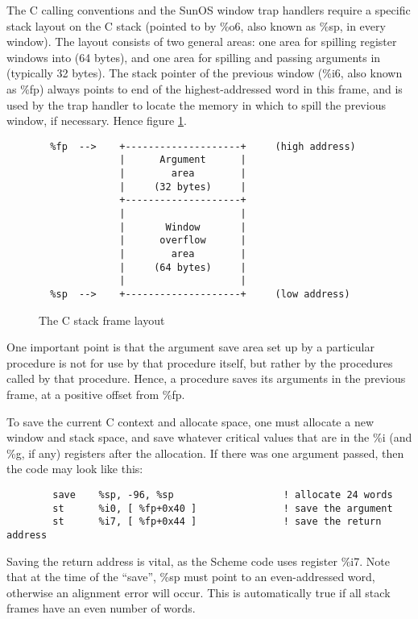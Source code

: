 The C calling conventions and the SunOS window trap handlers require a
specific stack layout on the C stack (pointed to by \%o6, also known as
\%sp, in every window). The layout consists of two general areas: one
area for spilling register windows into (64 bytes), and one area for
spilling and passing arguments in (typically 32 bytes). The stack
pointer of the previous window (\%i6, also known as \%fp) always points
to end of the highest-addressed word in this frame, and is used by
the trap handler to locate the memory in which to spill the previous
window, if necessary. Hence figure \ref{c-args}.

\begin{figure}[hbt]
\begin{verbatim}
  %fp  -->    +--------------------+     (high address)
              |      Argument      |
              |        area        |
              |     (32 bytes)     |
              +--------------------+
              |                    |
              |       Window       |
              |      overflow      |
              |        area        |
              |     (64 bytes)     |
              |                    |
  %sp  -->    +--------------------+     (low address)
\end{verbatim}
\caption{The C stack frame layout}
\label{c-args}
\end{figure}

One important point is that the argument save area set up by a particular
procedure is not for use by that procedure itself, but rather by the
procedures called by that procedure. Hence, a procedure saves its arguments
in the previous frame, at a positive offset from \%fp.

To save the current C context and allocate space, one must allocate a
new window and stack space, and save whatever critical values that are
in the \%i (and \%g, if any) registers after the allocation. If there
was one argument passed, then the code may look like this:

\begin{verbatim}
        save    %sp, -96, %sp                   ! allocate 24 words
        st      %i0, [ %fp+0x40 ]               ! save the argument
        st      %i7, [ %fp+0x44 ]               ! save the return address
\end{verbatim}

Saving the return address is vital, as the Scheme code uses register \%i7.
Note that at the time of the ``save'', \%sp must point to an even-addressed
word, otherwise an alignment error will occur. This is automatically true
if all stack frames have an even number of words.


